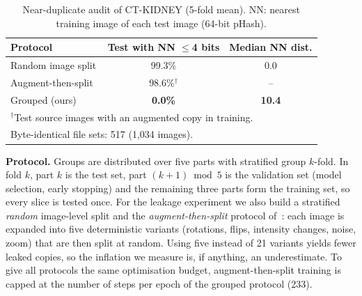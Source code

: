 \documentclass[conference]{IEEEtran}
\begin{document}
\begin{table}[t]
\centering
\caption{Near-duplicate audit of CT-KIDNEY (5-fold mean). NN: nearest training image of each test image
(64-bit pHash).}
\label{tab:audit}
\setlength{\tabcolsep}{4pt}
\begin{tabular}{lcc}
\toprule
Protocol & Test with NN $\le$4 bits & Median NN dist. \\
\midrule
Random image split & 99.3\% & 0.0 \\
Augment-then-split~\cite{devi2025cdr} & 98.6\%$^\dagger$ & -- \\
Grouped (ours) & \textbf{0.0\%} & \textbf{10.4} \\
\bottomrule
\multicolumn{3}{l}{\footnotesize $^\dagger$Test source images with an augmented copy in training.}\\
\multicolumn{3}{l}{\footnotesize Byte-identical file sets: 517 (1,034 images).}
\end{tabular}
\end{table}

\textbf{Protocol.} Groups are distributed over five parts with stratified group $k$-fold. In fold $k$, part $k$ is
the test set, part $(k{+}1)\bmod 5$ is the validation set (model selection, early stopping) and the remaining
three parts form the training set, so every slice is tested once. For the leakage experiment we also build a
stratified \emph{random} image-level split and the \emph{augment-then-split} protocol of~\cite{devi2025cdr}: each
image is expanded into five deterministic variants (rotations, flips, intensity changes, noise, zoom) that are
then split at random. Using five instead of 21 variants yields fewer leaked copies, so the inflation we measure
is, if anything, an underestimate. To give all protocols the same optimisation budget, augment-then-split
training is capped at the number of steps per epoch of the grouped protocol (233).

\end{document}
